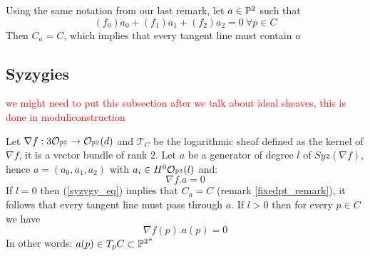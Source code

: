 \begin{remark}\label{fixedpt_remark}
Using the same notation from our last remark, let $a \in {\mathbb{P}^2}$ such that
\begin{equation}
({f_0}) a_0 + ({f_1}) a_1 + ({f_2}) a_2 = 0 \ \forall p \in C
\end{equation}
Then $C_a = C$, which implies that every tangent line must contain $a$
\end{remark}

\subsection{Syzygies}
\textcolor{red}{we might need to put this subsection after we talk about ideal sheaves, this is done in moduliconstruction}
\begin{remark}
Let $\nabla f: 3 \mathcal{O}_{\mathbb{P}^2} \to \mathcal{O}_{\mathbb{P}^2}(d)$ and $\mathcal{T}_C$ be the logarithmic sheaf defined as the kernel of $\nabla f$, it is a vector bundle of rank $2$. Let $a$ be a generator of degree $l$ of $Syz(\nabla f)$, hence $a = (a_0, a_1, a_2)$ with $a_i \in H^0 \mathcal{O}_{\mathbb{P}^2} (l)$ and:
\begin{equation}\label{syzygy_eq}
    \nabla f . a = 0
\end{equation}
If $l = 0$ then (\ref{syzygy_eq}) implies that $C_a = C$ (remark \ref{fixedpt_remark}), it follows that every tangent line must pass through $a$.
If $l>0$ then for every $p \in C$ we have
\begin{equation}
    \nabla f (p) . a(p) = 0
\end{equation}
In other words: $a(p) \in T_p C \subset {\mathbb{P}^2}^*$
\end{remark}
